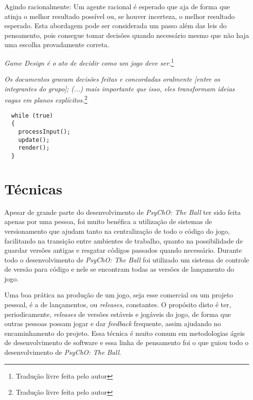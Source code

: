 Agindo racionalmente: Um agente racional é esperado que aja de forma que atinja o melhor resultado possível ou, se houver incerteza, o melhor resultado esperado. Esta abordagem pode ser considerada um passo além das leis do pensamento, pois consegue tomar decisões quando necessário mesmo que não haja uma escolha provadamente correta.



\begin{displayquote}
  \textit{Game Design é o ato de decidir como um jogo deve ser.}\footnote{Tradução livre feita pelo autor}
\end{displayquote}

\begin{displayquote}
  \textit{Os documentos gravam decisões feitas e concordadas oralmente [entre os integrantes do grupo]; (...) mais importante que isso, eles transformam ideias vagas em planos explícitos.}\footnote{Tradução livre feita pelo autor}
\end{displayquote}

\begin{lstlisting}
  while (true)
  {
    processInput();
    update();
    render();
  }
\end{lstlisting}

\section{Técnicas}
\label{sec:tecnicas}

Apesar de grande parte do desenvolvimento de \textit{PsyChO: The Ball} ter sido feita apenas por uma pessoa, foi muito benéfica a utilização de sistemas de versionamento que ajudam tanto na centralização de todo o código do jogo, facilitando na transição entre ambientes de trabalho, quanto na possibilidade de guardar versões antigas e resgatar códigos passados quando necessário. Durante todo o desenvolvimento de \textit{PsyChO: The Ball} foi utilizado um sistema de controle de versão para código e nele se encontram todas as versões de lançamento do jogo.

Uma boa prática na produção de um jogo, seja esse comercial ou um projeto pessoal, é a de lançamentos, ou \textit{releases}, constantes. O propósito disto é ter, periodicamente, \textit{releases} de versões estáveis e jogáveis do jogo, de forma que outras pessoas possam jogar e dar \textit{feedback} frequente, assim ajudando no encaminhamento do projeto. Essa técnica é muito comum em metodologias ágeis de desenvolvimento de software e essa linha de pensamento foi o que guiou todo o desenvolvimento de \textit{PsyChO: The Ball}.


